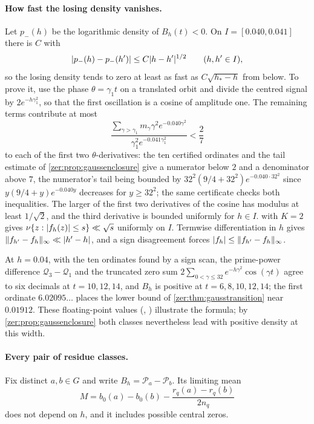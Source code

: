 \paragraph{How fast the losing density vanishes.}
Let $p_-(h)$ be the logarithmic density of $B_h(t)<0$. On $I=[0.040,0.041]$ there is $C$ with
\begin{equation}\label{zer:eq:gaussrate}
 \lvert p_-(h)-p_-(h')\rvert\le C\lvert h-h'\rvert^{1/2}\qquad(h,h'\in I),
\end{equation}
so the losing density tends to zero at least as fast as $C\sqrt{h_*-h}$ from below. To prove it,
use the phase $\theta=\gamma_1t$ on a translated orbit and divide the centred signal by
$2e^{-h\gamma_1^2}$, so that the first oscillation is a cosine of amplitude one. The remaining terms
contribute at most
\[
 \frac{\sum_{\gamma>\gamma_1}m_\gamma\gamma^2e^{-0.040\gamma^2}}{\gamma_1^2e^{-0.041\gamma_1^2}}<\frac27
\]
to each of the first two $\theta$-derivatives: the ten certified ordinates and the tail estimate
of \cref{zer:prop:gaussenclosure} give a numerator below $2$ and a denominator above $7$, the
numerator's tail being bounded by $32^2(9/4+32^2)e^{-0.040\cdot32^2}$ since $y(9/4+y)e^{-0.040y}$
decreases for $y\ge32^2$; the same certificate checks both inequalities. The larger of the first two
derivatives of the cosine has modulus at least $1/\sqrt2$, and the third derivative is bounded
uniformly for $h\in I$.  with $K=2$ gives
$\nu\{z:\lvert f_h(z)\rvert\le s\}\ll\sqrt s$ uniformly on $I$. Termwise differentiation in $h$ gives
$\lVert f_{h'}-f_h\rVert_\infty\ll\lvert h'-h\rvert$, and a sign disagreement forces
$\lvert f_h\rvert\le\lVert f_{h'}-f_h\rVert_\infty$.

At $h=0.04$, with the ten ordinates found by a sign scan, the prime-power difference
$\mathcal Q_3-\mathcal Q_1$ and the truncated zero sum $2\sum_{0<\gamma\le32}e^{-h\gamma^2}\cos(\gamma t)$
agree to six decimals at $t=10,12,14$, and $B_h$ is positive at $t=6,8,10,12,14$; the first
ordinate $6.02095\ldots$ places the lower bound of \cref{zer:thm:gausstransition} near $0.01912$. These
floating-point values (,
) illustrate the formula; by
\cref{zer:prop:gaussenclosure} both classes nevertheless lead with positive density at this width.

\paragraph{Every pair of residue classes.}
Fix distinct $a,b\in G$ and write $B_h=\mathcal P_a-\mathcal P_b$. Its limiting mean
\[
 M=b_0(a)-b_0(b)-\frac{r_q(a)-r_q(b)}{2n_q}
\]
does not depend on $h$, and it includes possible central zeros.

